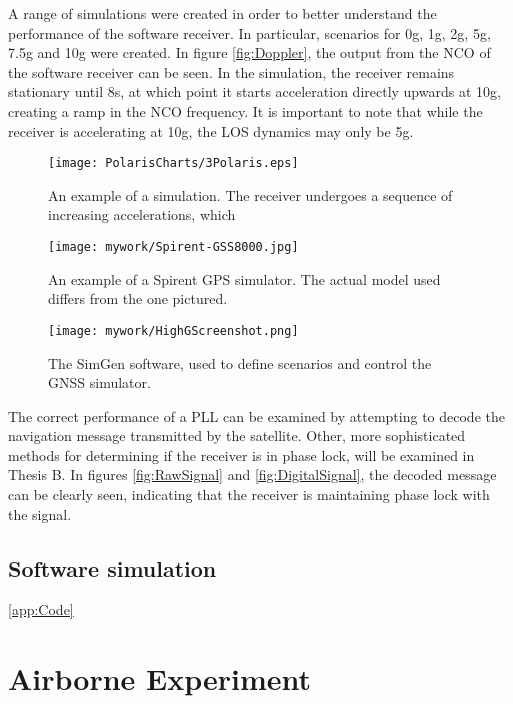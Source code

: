 A range of simulations were created in order to better understand the performance of the software receiver. In particular, scenarios for 0g, 1g, 2g, 5g, 7.5g and 10g were created. In figure \ref{fig:Doppler}, the output from the \ac{NCO} of the software receiver can be seen. In the simulation, the receiver remains stationary until 8s, at which point it starts acceleration directly upwards at 10g, creating a ramp in the \ac{NCO} frequency. It is important to note that while the receiver is accelerating at 10g, the \ac{LOS} dynamics may only be 5g. 

\begin{figure}[!htb] 
    \centering
    \texttt{[image: PolarisCharts/3Polaris.eps]} 
    \caption{An example of a simulation. The receiver undergoes a sequence of increasing accelerations, which }
    \label{fig:Polaris3}
\end{figure}


\begin{figure}[!htb] 
    \centering
    \texttt{[image: mywork/Spirent-GSS8000.jpg]} 
    \caption{An example of a Spirent \ac{GPS} simulator. The actual model used differs from the one pictured.}
    \label{fig:Spirent}
\end{figure}

\begin{figure}[!htb] 
    \centering
    \texttt{[image: mywork/HighGScreenshot.png]} 
    \caption{The SimGen software, used to define scenarios and control the \ac{GNSS} simulator.}
    \label{fig:HighGScreenshot}
\end{figure}


The correct performance of a \ac{PLL} can be examined by attempting to decode the navigation message transmitted by the satellite. Other, more sophisticated methods for determining if the  receiver is in phase lock, will be examined in Thesis B. In figures \ref{fig:RawSignal} and \ref{fig:DigitalSignal}, the decoded message can be clearly seen, indicating that the receiver is maintaining phase lock with the signal.

\subsection{Software simulation}
\ref{app:Code}

\section{Airborne Experiment}


